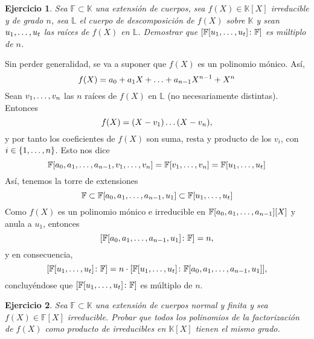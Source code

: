 \documentclass[11pt]{report}
\makeatletter
\renewenvironment{proof}[1][\proofname]{\par
  \pushQED{\qed}%
  \normalfont \topsep\z@skip %
  \trivlist
  \item[\hskip\labelsep
        \itshape
    #1\@addpunct{.}]\ignorespaces
}{%
  \popQED\endtrivlist\@endpefalse
}
\newcommand{\F}{\mathbb F}
\newcommand{\K}{\mathbb K}
\renewcommand{\L}{\mathbb L}
\newtheorem{ejercicio}{Ejercicio}
\makeatother
\begin{document}
\begin{ejercicio}
    Sea $\F \subset \K$ una extensión de cuerpos, sea $f(X) \in \K[X]$ irreducible y de grado $n$, sea $\L$ el cuerpo de descomposición de $f(X)$ sobre $\K$ y sean $u_1,\mathellipsis,u_t$ las raíces de $f(X)$ en $\L$. Demostrar que $[\F[u_1,\mathellipsis,u_t] \colon \F]$ es múltiplo de $n$.
\end{ejercicio}
    
\begin{proof}
    Sin perder generalidad, se va a suponer que $f(X)$ es un polinomio mónico. Así,
    \[f(X)=a_0+a_1X+\mathellipsis+a_{n-1}X^{n-1}+X^n\]
    Sean $v_1,\mathellipsis,v_n$ las $n$ raíces de $f(X)$ en $\L$ (no necesariamente distintas). Entonces
    \[f(X) = (X-v_1)\mathellipsis(X-v_n),\]
    y por tanto los coeficientes de $f(X)$ son suma, resta y producto de los $v_i$, con $i \in \{1,\mathellipsis,n\}$. Esto nos dice
    \[\F[a_0,a_1,\mathellipsis,a_{n-1},v_1,\mathellipsis,v_n] = \F[v_1,\mathellipsis,v_n] = \F[u_1,\mathellipsis,u_t]\]
    Así, tenemos la torre de extensiones
    \[\F \subset \F[a_0,a_1,\mathellipsis,a_{n-1},u_1] \subset \F[u_1,\mathellipsis,u_t]\]
    Como $f(X)$ es un polinomio mónico e irreducible en $\F[a_0,a_1,\mathellipsis,a_{n-1}][X]$ y anula a $u_1$, entonces
    \[[\F[a_0,a_1,\mathellipsis,a_{n-1},u_1] \colon \F] = n,\]
    y en consecuencia,
    \[[\F[u_1,\mathellipsis,u_t] \colon \F] = n \cdot [\F[u_1,\mathellipsis,u_t] \colon \F[a_0,a_1,\mathellipsis,a_{n-1},u_1]],\]
    concluyéndose que $[\F[u_1,\mathellipsis,u_t] \colon \F]$ es múltiplo de $n$.
\end{proof}

\begin{ejercicio}
Sea $\F \subset \K$ una extensión de cuerpos normal y finita y sea $f(X) \in \F[X]$ irreducible. Probar que todos los polinomios de la factorización de $f(X)$ como producto de irreducibles en $\K[X]$ tienen el mismo grado.
\end{ejercicio}
\end{document}
